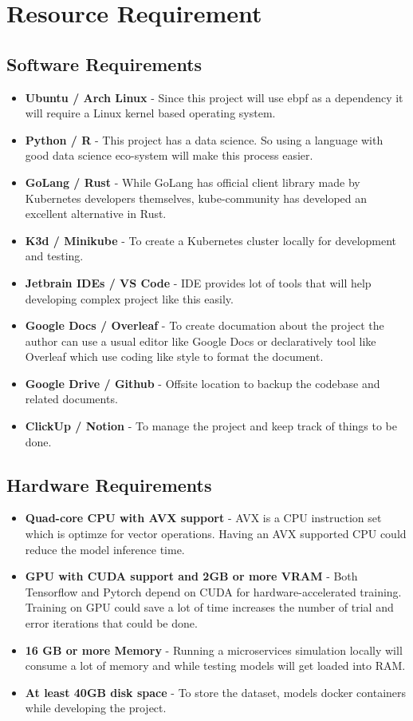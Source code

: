 \section{Resource Requirement}

\subsection{Software Requirements}

\begin{itemize}[noitemsep,nolistsep] 
\item \textbf{Ubuntu / Arch Linux} - Since this project will use \ac{ebpf} as a dependency it will require a Linux kernel based operating system.
\item \textbf{Python / R} - This project has a data science. So using a language with good data science eco-system will make this process easier.
\item \textbf{GoLang / Rust} - While GoLang has official client library made by Kubernetes developers themselves, kube-community has developed an excellent alternative in Rust.
\item \textbf{K3d / Minikube} - To create a Kubernetes cluster locally for development and testing.
\item \textbf{Jetbrain IDEs / VS Code} - IDE provides lot of tools that will help developing complex project like this easily.
\item \textbf{Google Docs / Overleaf}  - To create documation about the project the author can use a usual editor like Google Docs or declaratively tool like Overleaf which use coding like style to format the document.
\item \textbf{Google Drive / Github} - Offsite location to backup the codebase and related documents.
\item \textbf{ClickUp / Notion} - To manage the project and keep track of things to be done.
\end{itemize}

\subsection{Hardware Requirements}
\begin{itemize}[noitemsep,nolistsep] 
    \item \textbf{Quad-core CPU with AVX support} - AVX is a CPU instruction set which is optimze for vector operations. Having an AVX supported CPU could reduce the model inference time.
    \item \textbf{GPU with CUDA support and 2GB or more VRAM} - Both Tensorflow and Pytorch depend on CUDA for hardware-accelerated training. Training on GPU could save a lot of time increases the number of trial and error iterations that could be done.
    \item \textbf{16 GB or more Memory} - Running a microservices simulation locally will consume a lot of memory and while testing models will get loaded into RAM.
    \item \textbf{At least 40GB disk space} - To store the dataset, models docker containers while developing the project.
\end{itemize}

